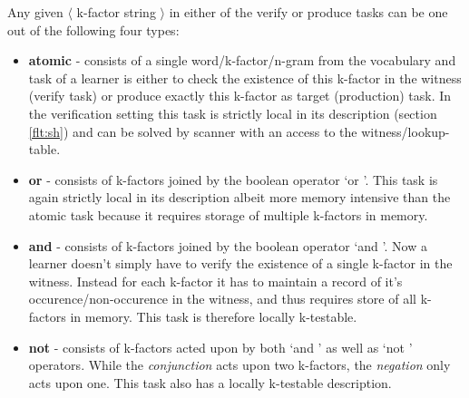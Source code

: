 Any given $\langle$ k-factor string $\rangle$ in either of the verify or produce tasks can be one out of the following four types:
\begin{itemize}
	\item \textbf{atomic} - consists of a single word/k-factor/n-gram from the vocabulary and task of a learner is either to check the existence of this k-factor in the witness (verify task) or produce exactly this k-factor as target (production) task. In the verification setting this task is strictly local in its description (section \ref{flt:sh}) and can be solved by scanner with an access to the witness/lookup-table. 
	\item \textbf{or} - consists of k-factors joined by the boolean operator \lq or \rq{}. This task is again strictly local in its description albeit more memory intensive than the atomic task because it requires storage of multiple k-factors in memory.
	\item \textbf{and} - consists of k-factors joined by the boolean operator \lq and \rq{}. Now a learner doesn't simply have to verify the existence of a single k-factor in the witness. Instead for each k-factor it has to maintain a record of it's occurence/non-occurence in the witness, and thus requires store of all k-factors in memory. This task is therefore locally k-testable. 
	\item \textbf{not} - consists of k-factors acted upon by both \lq and \rq{} as well as \lq not \rq{} operators. While the \textit{conjunction} acts upon two k-factors, the \textit{negation} only acts upon one. This task also has a locally k-testable description. 
\end{itemize}


